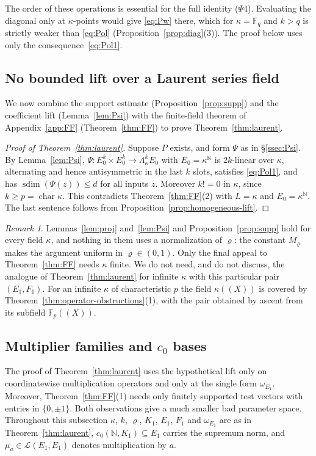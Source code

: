 \documentclass[11pt]{amsart}
\theoremstyle{definition}
\theoremstyle{remark}
\newtheorem{remark}[theorem]{Remark}
\numberwithin{equation}{section}
\newcommand{\N}{\mathbb N}
\newcommand{\F}{\mathbb F}
\newcommand{\cL}{\mathcal L}
\newcommand{\sdim}{\operatorname{sdim}}
\theoremstyle{plain}
\theoremstyle{definition}
\theoremstyle{plain}
\begin{document}
The order of these operations is essential for the full identity ($\Psi$4). Evaluating the diagonal only at
$\kappa$\nobreakdash-points would give \eqref{eq:Pw} there, which for $\kappa=\F_q$ and $k>q$ is strictly weaker than
\eqref{eq:Pol} (Proposition~\ref{prop:diag}(3)). The proof below uses only the consequence~\eqref{eq:Pol1}.

\subsection{No bounded lift over a Laurent series field}

We now combine the support estimate (Proposition~\ref{prop:supp}) and the coefficient lift (Lemma~\ref{lem:Psi}) with the finite-field theorem of Appendix~\ref{app:FF} (Theorem~\ref{thm:FF}) to prove Theorem~\ref{thm:laurent}.

\begin{proof}[Proof of Theorem~\ref{thm:laurent}]
Suppose $P$ exists, and form $\Psi$ as in \S\ref{ssec:Psi}. By Lemma~\ref{lem:Psi},
$\Psi\colon E_0^k\times E_0^k\to\Lambda^k_\kappa E_0$ with $E_0=\kappa^\N$ is $2k$\nobreakdash-linear over $\kappa$, alternating and hence
antisymmetric in the last $k$ slots, satisfies \eqref{eq:Pol1}, and has $\sdim(\Psi(z))\le d$ for all inputs $z$. Moreover
$k!=0$ in $\kappa$, since $k\ge p=\operatorname{char}\kappa$. This contradicts Theorem~\ref{thm:FF}(2) with $L=\kappa$
and $E_0=\kappa^\N$. The last sentence follows from Proposition~\ref{prop:homogeneous-lift}.
\end{proof}

\begin{remark}\label{rem:infkappa}
Lemmas~\ref{lem:proj} and~\ref{lem:Psi} and Proposition~\ref{prop:supp} hold for every field $\kappa$, and nothing in them
uses a normalization of $\varrho$: the constant $M_\varrho$ makes the argument uniform in $\varrho\in(0,1)$. Only the final appeal to
Theorem~\ref{thm:FF} needs $\kappa$ finite. We do not need, and do not discuss, the analogue of
Theorem~\ref{thm:laurent} for infinite $\kappa$ with this particular pair $(E_1,F_1)$. For an infinite $\kappa$ of
characteristic $p$ the field $\kappa((X))$ is covered by Theorem~\ref{thm:operator-obstructions}(1), with the pair obtained by ascent from its
subfield $\F_p((X))$.
\end{remark}

\subsection{Multiplier families and \texorpdfstring{$c_0$}{c0} bases}\label{lau:ssec:multipliers}
The proof of Theorem~\ref{thm:laurent} uses the hypothetical lift only on coordinatewise multiplication operators and
only at the single form $\omega_{E_1}$. Moreover, Theorem~\ref{thm:FF}(1) needs only finitely supported test vectors with
entries in $\{0,\pm1\}$. Both observations give a much smaller bad parameter space. Throughout this subsection
$\kappa$, $k$, $\varrho$, $K_1$, $E_1$, $F_1$ and $\omega_{E_1}$ are as in Theorem~\ref{thm:laurent}, $c_0(\N,K_1)\subseteq E_1$ carries the
supremum norm, and $\mu_a\in\cL(E_1,E_1)$ denotes multiplication by $a$.
\end{document}
